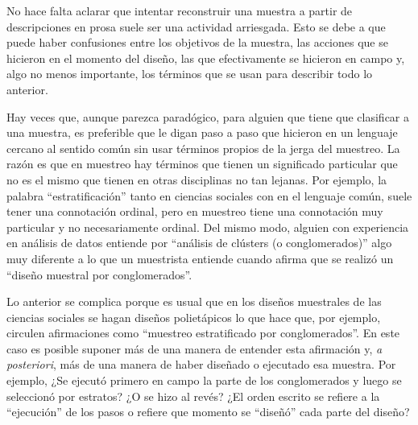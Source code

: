 \documentclass[
  spanish,
  a4paper,
]{scrreprt}
\begin{document}
\begin{tcolorbox}[enhanced jigsaw, leftrule=.75mm, title=\textcolor{quarto-callout-caution-color}{\faFire}\hspace{0.5em}{Precaución}, colframe=quarto-callout-caution-color-frame, coltitle=black, breakable, opacityback=0, bottomtitle=1mm, opacitybacktitle=0.6, rightrule=.15mm, titlerule=0mm, toprule=.15mm, colbacktitle=quarto-callout-caution-color!10!white, left=2mm, toptitle=1mm, bottomrule=.15mm, arc=.35mm, colback=white]

No hace falta aclarar que intentar reconstruir una muestra a partir de
descripciones en prosa suele ser una actividad arriesgada. Esto se debe
a que puede haber confusiones entre los objetivos de la muestra, las
acciones que se hicieron en el momento del diseño, las que efectivamente
se hicieron en campo y, algo no menos importante, los términos que se
usan para describir todo lo anterior.

Hay veces que, aunque parezca paradógico, para alguien que tiene que
clasificar a una muestra, es preferible que le digan paso a paso que
hicieron en un lenguaje cercano al sentido común sin usar términos
propios de la jerga del muestreo. La razón es que en muestreo hay
términos que tienen un significado particular que no es el mismo que
tienen en otras disciplinas no tan lejanas. Por ejemplo, la palabra
``estratificación'' tanto en ciencias sociales con en el lenguaje común,
suele tener una connotación ordinal, pero en muestreo tiene una
connotación muy particular y no necesariamente ordinal. Del mismo modo,
alguien con experiencia en análisis de datos entiende por ``análisis de
clústers (o conglomerados)'' algo muy diferente a lo que un muestrista
entiende cuando afirma que se realizó un ``diseño muestral por
conglomerados''.

Lo anterior se complica porque es usual que en los diseños muestrales de
las ciencias sociales se hagan diseños polietápicos lo que hace que, por
ejemplo, circulen afirmaciones como ``muestreo estratificado por
conglomerados''. En este caso es posible suponer más de una manera de
entender esta afirmación y, \emph{a posteriori}, más de una manera de
haber diseñado o ejecutado esa muestra. Por ejemplo, ¿Se ejecutó primero
en campo la parte de los conglomerados y luego se seleccionó por
estratos? ¿O se hizo al revés? ¿El orden escrito se refiere a la
``ejecución'' de los pasos o refiere que momento se ``diseñó'' cada
parte del diseño?

\end{tcolorbox}
\end{document}
